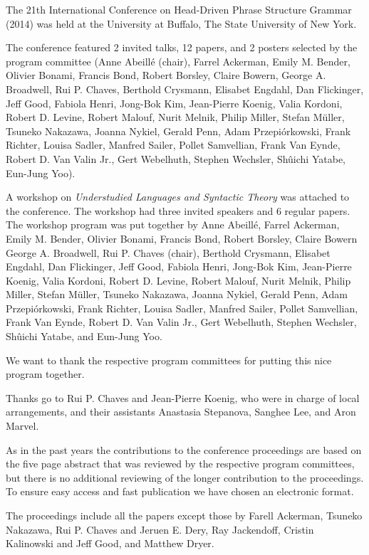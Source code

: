 The 21th International Conference on Head-Driven Phrase Structure Grammar (2014) was held at the
University at Buffalo, The State University of New York.

The conference featured 2 invited talks, 12 papers, and 2 posters selected by the program committee 
(Anne Abeillé (chair),
Farrel Ackerman,
Emily M. Bender,
Olivier Bonami,
Francis Bond,
Robert Borsley,
Claire Bowern,
George A. Broadwell,
Rui P. Chaves,
Berthold Crysmann,
Elisabet Engdahl,
Dan Flickinger,
Jeff Good,
Fabiola Henri,
Jong-Bok Kim,
Jean-Pierre Koenig,
Valia Kordoni,
Robert D. Levine,
Robert Malouf,
Nurit Melnik,
Philip Miller,
Stefan Müller,
Tsuneko Nakazawa,
Joanna Nykiel,
Gerald Penn,
Adam Przepiórkowski,
Frank Richter,
Louisa Sadler,
Manfred Sailer,
Pollet Samvellian,
Frank Van Eynde,
Robert D. Van Valin Jr.,
Gert Webelhuth,
Stephen Wechsler,
Shûichi Yatabe,
Eun-Jung Yoo).

A workshop on \emph{Understudied Languages and Syntactic Theory}
was attached to the conference. The workshop had three invited speakers and 
6 regular papers. The workshop program was put together by Anne Abeillé,
Farrel Ackerman,
Emily M. Bender,
Olivier Bonami,
Francis Bond,
Robert Borsley,
Claire Bowern
George A. Broadwell,
Rui P. Chaves (chair),
Berthold Crysmann,
Elisabet Engdahl,
Dan Flickinger,
Jeff Good,
Fabiola Henri,
Jong-Bok Kim,
Jean-Pierre Koenig,
Valia Kordoni,
Robert D. Levine,
Robert Malouf,
Nurit Melnik,
Philip Miller,
Stefan Müller,
Tsuneko Nakazawa,
Joanna Nykiel,
Gerald Penn,
Adam Przepiórkowski,
Frank Richter,
Louisa Sadler,
Manfred Sailer,
Pollet Samvellian,
Frank Van Eynde,
Robert D. Van Valin Jr.,
Gert Webelhuth,
Stephen Wechsler,
Shûichi Yatabe, and
Eun-Jung Yoo.

We want to thank the respective program committees for putting this nice program together.

Thanks go to Rui P. Chaves and Jean-Pierre Koenig, who were
in charge of local arrangements, and their assistants Anastasia Stepanova, Sanghee Lee, and Aron Marvel.
 

As in the past years the contributions to the conference proceedings are based on the five page abstract
that was reviewed by the respective program committees, but there is no additional reviewing of the
longer contribution to the proceedings.
To ensure easy access and fast publication we have chosen an electronic format.

The proceedings include all the papers except those by Farell Ackerman, Tsu\-ne\-ko Nakazawa, Rui
P. Chaves and Jeruen E. Dery, Ray Jackendoff, Cristin Kalinowski and Jeff Good, and Matthew Dryer.

